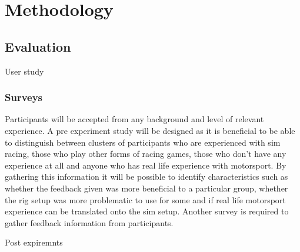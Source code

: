 \section{Methodology}

\subsection{Evaluation}
	User study

\subsubsection{Surveys}
	Participants will be accepted from any background and level of relevant experience. A pre experiment study will be designed as it is beneficial to be able to distinguish between clusters of participants who are experienced with sim racing, those who play other forms of racing games, those who don't have any experience at all and anyone who has real life experience with motorsport. By gathering this information it will be possible to identify characteristics such as whether the feedback given was more beneficial to a particular group, whether the rig setup was more problematic to use for some and if real life motorsport experience can be translated onto the sim setup. Another survey is required to gather feedback information from participants. 

		Post expiremnts

